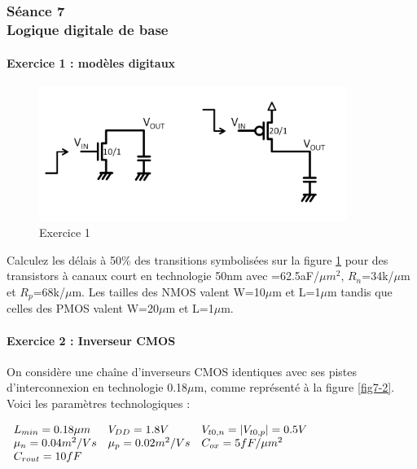 \documentclass[paper=a4, fontsize=11pt]{article} %
\numberwithin{equation}{section} %
\numberwithin{figure}{section} %
\numberwithin{table}{section} %
\begin{document}
\newpage
\part{}
\setcounter{figure}{0}
\setcounter{section}{7}
\section{Séance 7\\ Logique digitale de base}
\subsection*{Exercice 1 : modèles digitaux}

\begin{figure}[!htbp]
   \centering
   \includegraphics[width=10cm]{figure/fig7-1.png}
   \caption{Exercice 1}
   \label{fig7-1}
\end{figure}
Calculez les délais à 50\% des transitions symbolisées sur la figure \ref{fig7-1} pour des transistors à canaux court en technologie 50nm avec \cox=62.5aF/$\mu m^2$, $R_n$=34k/$\mu$m et $R_p$=68k/$\mu$m.
Les tailles des NMOS valent W=10$\mu$m et L=1$\mu$m tandis que celles des PMOS valent W=20$\mu$m et L=1$\mu$m.

\subsection*{Exercice 2 : Inverseur CMOS}

On considère une chaîne d'inverseurs CMOS identiques avec ses pistes d'interconnexion en technologie 0.18$\mu$m, comme représenté à la figure \ref{fig7-2}. Voici les paramètres technologiques :


\begin{center}
$
	\begin{array}{l l l}
		L_{min} = 0.18 \mu m 	& V_{DD} = 1.8 V 						&V_{t0,n} = |V_{t0,p} | = 0.5 V\\
		\mu_n = 0.04 m^2/Vs 		&\mu_p = 0.02 m^2/Vs	& C_{ox} = 5 fF/\mu m^2\\
		C_{rout} = 10fF&&\\
	\end{array}
	$
\end{center}
\end{document}
